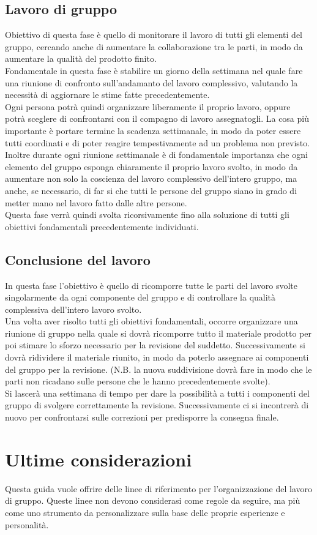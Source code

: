\documentclass[11pt,a4paper]{article}
\begin{document}
	\subsection{Lavoro di gruppo}
	Obiettivo di questa fase è quello di monitorare il lavoro di tutti gli elementi del gruppo, cercando anche di aumentare la collaborazione tra le parti, in modo da aumentare la qualità del prodotto finito.\\
	Fondamentale in questa fase è stabilire un giorno della settimana nel quale fare una riunione di confronto sull'andamanto del lavoro complessivo, valutando la necessità di aggiornare le stime fatte precedentemente.\\
	Ogni persona potrà quindi organizzare liberamente il proprio lavoro, oppure potrà sceglere di confrontarsi con il compagno di lavoro assegnatogli. La cosa più importante è portare termine la scadenza settimanale, in modo da poter essere tutti coordinati e di poter reagire tempestivamente ad un problema non previsto.\\
	Inoltre durante ogni riunione settimanale è di fondamentale importanza che ogni elemento del gruppo esponga chiaramente il proprio lavoro svolto, in modo da aumentare non solo la coscienza del lavoro complessivo dell'intero gruppo, ma anche, se necessario, di far si che tutti le persone del gruppo siano in grado di metter mano nel lavoro fatto dalle altre persone.\\
	Questa fase verrà quindi svolta ricorsivamente fino alla soluzione di tutti gli obiettivi fondamentali precedentemente individuati.\\
	
	\subsection{Conclusione del lavoro}
	In questa fase l'obiettivo è quello di ricomporre tutte le parti del lavoro svolte singolarmente da ogni componente del gruppo e di controllare la qualità complessiva dell'intero lavoro svolto.\\
	Una volta aver risolto tutti gli obiettivi fondamentali, occorre organizzare una riunione di gruppo nella quale si dovrà ricomporre tutto il materiale prodotto per poi stimare lo sforzo necessario per la revisione del suddetto. Successivamente si dovrà ridividere il materiale riunito, in modo da poterlo assegnare ai componenti del gruppo per la revisione. (N.B. la nuova suddivisione dovrà fare in modo che le parti non ricadano sulle persone che le hanno precedentemente svolte).\\
	Si lascerà una settimana di tempo per dare la possibilità a tutti i componenti del gruppo di svolgere correttamente la revisione. Successivamente ci si incontrerà di nuovo per confrontarsi sulle correzioni per predisporre la consegna finale.\\
	
	\section{Ultime considerazioni}
	Questa guida vuole offrire delle linee di riferimento per l'organizzazione del lavoro di gruppo. Queste linee non devono considerasi come regole da seguire, ma più come uno strumento da personalizzare sulla base delle proprie esperienze e personalità. \\
	
	
\end{document}
